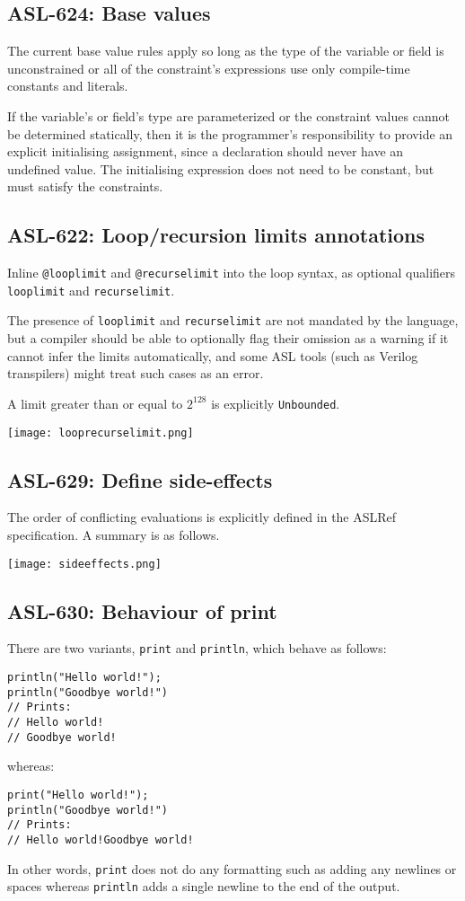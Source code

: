 \subsection{ASL-624: Base values}

The current base value rules apply so long as the type of the variable or
field is unconstrained or all of the constraint's expressions use only
compile-time constants and literals.

If the variable's or field's type are parameterized or the constraint
values cannot be determined statically, then it is the programmer's
responsibility to provide an explicit initialising assignment, since a
declaration should never have an undefined value. The initialising
expression does not need to be constant, but must satisfy the
constraints.

\subsection{ASL-622: Loop/recursion limits annotations}

Inline \texttt{@looplimit} and \texttt{@recurselimit} into the loop syntax, as
optional qualifiers \texttt{looplimit} and \texttt{recurselimit}.

The presence of \texttt{looplimit} and \texttt{recurselimit} are not mandated
by the language, but a compiler should be able to optionally flag their
omission as a warning if it cannot infer the limits automatically, and some ASL
tools (such as Verilog transpilers) might treat such cases as an error.

A limit greater than or equal to $2^{128}$ is explicitly \texttt{Unbounded}.


\texttt{[image: looprecurselimit.png]}

\subsection{ASL-629: Define side-effects}

The order of conflicting evaluations is explicitly defined in the ASLRef
specification. A summary is as follows.

\texttt{[image: sideeffects.png]}

\subsection{ASL-630: Behaviour of print}
There are two variants, \texttt{print} and \texttt{println}, which behave
as follows:
\begin{verbatim}
println("Hello world!");
println("Goodbye world!")
// Prints:
// Hello world!
// Goodbye world!
\end{verbatim}
whereas:
\begin{verbatim}
print("Hello world!");
println("Goodbye world!")
// Prints:
// Hello world!Goodbye world!
\end{verbatim}
In other words, \texttt{print} does not do any formatting such as adding any
newlines or spaces whereas \texttt{println} adds a single newline to the end of
the output.

